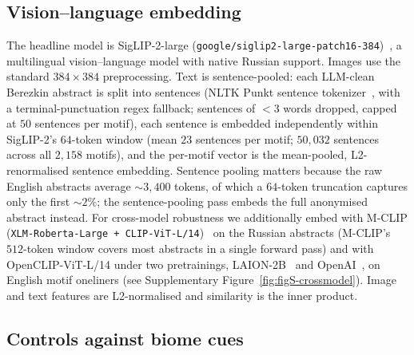 \documentclass[11pt,a4paper]{article}
\begin{document}
\subsection*{Vision--language embedding}

The headline model is SigLIP-2-large
(\texttt{google/siglip2-large-patch16-384})~\citep{tschannen2024siglip2},
a multilingual vision--language model with native Russian support.
Images use the standard $384\times 384$ preprocessing. Text is
sentence-pooled: each LLM-clean Berezkin abstract is split into
sentences (NLTK Punkt sentence
tokenizer~\citep{kiss2006punkt}, with a terminal-punctuation
regex fallback; sentences of $<3$ words dropped, capped at $50$
sentences per motif), each sentence is embedded independently within
SigLIP-2's $64$-token window (mean $23$ sentences per motif;
$50{,}032$ sentences across all $2{,}158$ motifs), and the per-motif
vector is the
mean-pooled, L2-renormalised sentence embedding. Sentence pooling
matters because the raw English abstracts average $\sim 3{,}400$
tokens, of which a $64$-token truncation captures only the first
$\sim 2\%$; the sentence-pooling pass embeds the full anonymised
abstract instead. For cross-model robustness we additionally embed
with M-CLIP (\texttt{XLM-Roberta-Large + CLIP-ViT-L/14})~\citep{carlsson2022mclip}
on the Russian abstracts (M-CLIP's $512$-token window covers most
abstracts in a single forward pass) and with OpenCLIP-ViT-L/14 under
two pretrainings, LAION-2B~\citep{schuhmann2022laion} and
OpenAI~\citep{radford2021clip}, on English motif oneliners
(see Supplementary Figure~\ref{fig:figS-crossmodel}). Image and
text features are L2-normalised and similarity is the inner
product.

\subsection*{Controls against biome cues}
\end{document}
